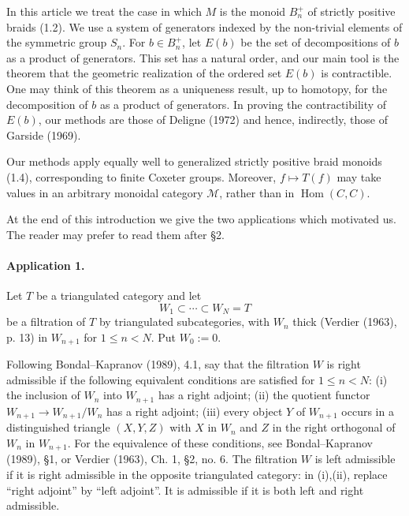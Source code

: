 \documentclass[11pt]{article}
\newcommand{\Hom}{\operatorname{Hom}}
\newcommand{\calM}{\mathcal M}
\begin{document}
In this article we treat the case in which $M$ is the monoid $B_n^+$ of strictly positive braids (1.2). We use a system of generators indexed by the non-trivial elements of the symmetric group $S_n$. For $b\in B_n^+$, let $E(b)$ be the set of decompositions of $b$ as a product of generators. This set has a natural order, and our main tool is the theorem that the geometric realization of the ordered set $E(b)$ is contractible. One may think of this theorem as a uniqueness result, up to homotopy, for the decomposition of $b$ as a product of generators. In proving the contractibility of $E(b)$, our methods are those of Deligne (1972) and hence, indirectly, those of Garside (1969).

Our methods apply equally well to generalized strictly positive braid monoids (1.4), corresponding to finite Coxeter groups. Moreover, $f\mapsto T(f)$ may take values in an arbitrary monoidal category $\calM$, rather than in $\Hom(C,C)$.

At the end of this introduction we give the two applications which motivated us. The reader may prefer to read them after \S2.

\paragraph{Application 1.} Let $T$ be a triangulated category and let
\[
 W_1\subset\cdots\subset W_N=T
\]
be a filtration of $T$ by triangulated subcategories, with $W_n$ thick (Verdier (1963), p. 13) in $W_{n+1}$ for $1\leq n<N$. Put $W_0:=0$.

Following Bondal--Kapranov (1989), 4.1, say that the filtration $W$ is right admissible if the following equivalent conditions are satisfied for $1\leq n<N$: (i) the inclusion of $W_n$ into $W_{n+1}$ has a right adjoint; (ii) the quotient functor $W_{n+1}\to W_{n+1}/W_n$ has a right adjoint; (iii) every object $Y$ of $W_{n+1}$ occurs in a distinguished triangle $(X,Y,Z)$ with $X$ in $W_n$ and $Z$ in the right orthogonal of $W_n$ in $W_{n+1}$. For the equivalence of these conditions, see Bondal--Kapranov (1989), \S1, or Verdier (1963), Ch. 1, \S2, no. 6. The filtration $W$ is left admissible if it is right admissible in the opposite triangulated category: in (i),(ii), replace ``right adjoint'' by ``left adjoint''. It is admissible if it is both left and right admissible.
\end{document}
